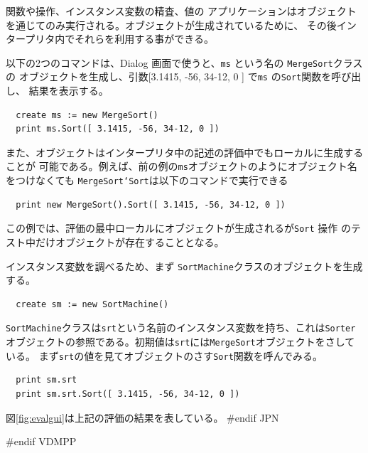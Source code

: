 \documentclass[\pformat,12pt]{article}
\newcommand{\aaa}{\tt }
\newcommand{\guicmd}[1]{{\sf #1}}
\newcommand{\guicmd}[1]{{\gt #1}}
\begin{document}
関数や操作、インスタンス変数の精査、値の
アプリケーションはオブジェクトを通じてのみ実行される。オブジェクトが生成されているために、
その後インタープリタ内でそれらを利用する事ができる。

以下の2つのコマンドは、\guicmd{Dialog} 画面で使うと、{\aaa ms} という名の {\aaa MergeSort}クラスの
オブジェクトを生成し、引数[3.1415, -56, 34-12, 0 ] で{\tt ms} の{\tt Sort}関数を呼び出し、
結果を表示する。

\begin{verbatim}
  create ms := new MergeSort()
  print ms.Sort([ 3.1415, -56, 34-12, 0 ])
\end{verbatim}

また、オブジェクトはインタープリタ中の記述の評価中でもローカルに生成することが
可能である。例えば、前の例の{\tt ms}オブジェクトのようにオブジェクト名をつけなくても
{\tt MergeSort`Sort}は以下のコマンドで実行できる 

\begin{verbatim}
  print new MergeSort().Sort([ 3.1415, -56, 34-12, 0 ])
\end{verbatim}

この例では、評価の最中ローカルにオブジェクトが生成されるが{\tt Sort} 操作
のテスト中だけオブジェクトが存在することとなる。

インスタンス変数を調べるため、まず {\tt SortMachine}クラスのオブジェクトを生成する。

\begin{verbatim}
  create sm := new SortMachine()
\end{verbatim}

{\tt SortMachine}クラスは{\tt srt}という名前のインスタンス変数を持ち、これは{\tt Sorter}
オブジェクトの参照である。初期値は{\tt srt}には{\tt MergeSort}オブジェクトをさしている。
まず{\tt srt}の値を見てオブジェクトのさす{\tt Sort}関数を呼んでみる。

\begin{verbatim}
  print sm.srt
  print sm.srt.Sort([ 3.1415, -56, 34-12, 0 ])
\end{verbatim}

図\ref{fig:evalgui}は上記の評価の結果を表している。
#endif JPN

#endif VDMPP
\end{document}
